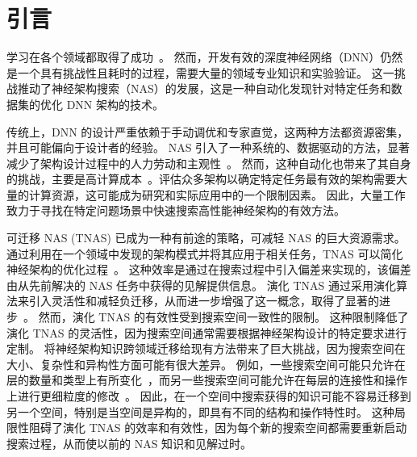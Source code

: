 \documentclass[../main_zh.tex]{subfiles}
\begin{document}
\section{引言}

学习在各个领域都取得了成功~\cite{DBLP:conf/cvpr/HeZRS16,DBLP:conf/cvpr/RedmonDGF16,DBLP:conf/acl/FosterVUMKFJSWB18}。
然而，开发有效的深度神经网络（DNN）仍然是一个具有挑战性且耗时的过程，需要大量的领域专业知识和实验验证。
这一挑战推动了神经架构搜索（NAS）的发展，这是一种自动化发现针对特定任务和数据集的优化 DNN 架构的技术。

传统上，DNN 的设计严重依赖于手动调优和专家直觉，这两种方法都资源密集，并且可能偏向于设计者的经验。
NAS 引入了一种系统的、数据驱动的方法，显著减少了架构设计过程中的人力劳动和主观性~\cite{DBLP:conf/iclr/ZophL17,DBLP:conf/cvpr/ZophVSL18}。
然而，这种自动化也带来了其自身的挑战，主要是高计算成本~\cite{pham_efficient_2018}。评估众多架构以确定特定任务最有效的架构需要大量的计算资源，这可能成为研究和实际应用中的一个限制因素。
因此，大量工作~\cite{pham_efficient_2018,DBLP:conf/iclr/LiuSY19,DBLP:journals/tnn/DongHFTTO23,DBLP:conf/iclr/BakerGRN18,DBLP:conf/iconip/HouDFQ21} 致力于寻找在特定问题场景中快速搜索高性能神经架构的有效方法。


可迁移 NAS (TNAS) 已成为一种有前途的策略，可减轻 NAS 的巨大资源需求。
通过利用在一个领域中发现的架构模式并将其应用于相关任务，TNAS 可以简化神经架构的优化过程~\cite{DBLP:journals/pami/LuSGBDB21}。
这种效率是通过在搜索过程中引入偏差来实现的，该偏差由从先前解决的 NAS 任务中获得的见解提供信息。
演化 TNAS 通过采用演化算法来引入灵活性和减轻负迁移，从而进一步增强了这一概念，取得了显著的进步~\cite{DBLP:conf/cvpr/LiaoJD23,DBLP:journals/tec/ZhouWFLWT24}。
然而，演化 TNAS 的有效性受到搜索空间一致性的限制。
这种限制降低了演化 TNAS 的灵活性，因为搜索空间通常需要根据神经架构设计的特定要求进行定制。
将神经架构知识跨领域迁移给现有方法带来了巨大挑战，因为搜索空间在大小、复杂性和异构性方面可能有很大差异。
例如，一些搜索空间可能只允许在层的数量和类型上有所变化~\cite{DBLP:journals/tnn/SunXZY20}，而另一些搜索空间可能允许在每层的连接性和操作上进行更细粒度的修改~\cite{DBLP:conf/cvpr/ZophVSL18,DBLP:conf/iclr/LiuSY19,DBLP:journals/tnn/DongHFTTO23}。
因此，在一个空间中搜索获得的知识可能不容易迁移到另一个空间，特别是当空间是异构的，即具有不同的结构和操作特性时。
这种局限性阻碍了演化 TNAS 的效率和有效性，因为每个新的搜索空间都需要重新启动搜索过程，从而使以前的 NAS 知识和见解过时。
\end{document}

